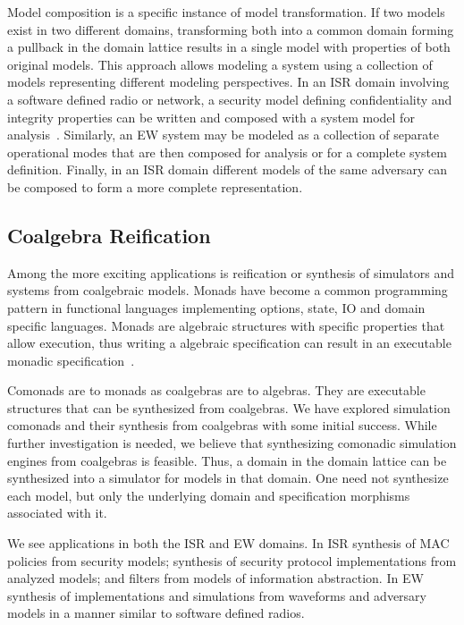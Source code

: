 \documentclass[12pt]{article}
\begin{document}
Model composition is a specific instance of model transformation.  If
two models exist in two different domains, transforming both into a
common domain forming a pullback in the domain lattice results in a
single model with properties of both original models.  This approach
allows modeling a system using a collection of models representing
different modeling perspectives. In an ISR domain involving a software
defined radio or network, a security model defining confidentiality
and integrity properties can be written and composed with a system
model for analysis~\cite{Kimmell:08:System-Synthesi}.  Similarly, an
EW system may be modeled as a collection of separate operational modes
that are then composed for analysis or for a complete system
definition.  Finally, in an ISR domain different models of the same
adversary can be composed to form a more complete representation.

\subsection{Coalgebra Reification}

Among the more exciting applications is reification or synthesis of
simulators and systems from coalgebraic models.  Monads have become a
common programming pattern in functional languages implementing
options, state, IO and domain specific languages.  Monads are
algebraic structures with specific properties that allow execution,
thus writing a algebraic specification can result in an executable
monadic
specification~\cite{Kimmell:08:Synthesizing-So,Peck:11:Hardware/Softwa}.

Comonads are to monads as coalgebras are to algebras.  They are
executable structures that can be synthesized from coalgebras.  We
have explored simulation comonads and their synthesis from coalgebras
with some initial success.  While further investigation is needed, we
believe that synthesizing comonadic simulation engines from coalgebras
is feasible.  Thus, a domain in the domain lattice can be synthesized
into a simulator for models in that domain.  One need not synthesize
each model, but only the underlying domain and specification morphisms
associated with it.

We see applications in both the ISR and EW domains.  In ISR synthesis
of MAC policies from security models; synthesis of security protocol
implementations from analyzed models; and filters from models of
information abstraction.  In EW synthesis of implementations and
simulations from waveforms and adversary models in a manner similar to
software defined radios.


\end{document}
